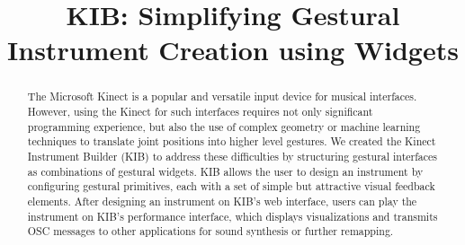 \documentclass{nime-alternate}
\begin{document}
%

\title{KIB: Simplifying Gestural Instrument Creation using Widgets}

%
%
%
%
%

\maketitle
\begin{abstract}
The Microsoft Kinect is a popular and versatile input device for musical interfaces.
However, using the Kinect for such interfaces requires not only significant programming
experience, but also the use of complex geometry or machine learning techniques to translate joint
positions into higher level gestures. We created the Kinect Instrument Builder (KIB) to
address these difficulties by structuring gestural interfaces as combinations of gestural
widgets. KIB allows the user to design an instrument by configuring gestural primitives,
each with a set of simple but attractive visual feedback elements. After designing an instrument
on KIB's web interface, users can play the instrument on KIB's performance interface, 
which displays visualizations and transmits OSC messages to other applications for sound synthesis
or further remapping.
\end{abstract}

\end{document}
